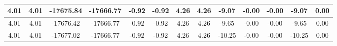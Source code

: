 \begin{table}[htbp]
\begin{adjustbox}{angle=90}
\begin{tabular}{|c|c|c|c|c|c|c|c|c|c|c|c|c|}
 4.01 & 4.01 & -17675.84 & -17666.77 & -0.92 & -0.92 & 4.26 & 4.26 & -9.07 & -0.00 & -0.00 & -9.07 & 0.00\\ \hline
 4.01 & 4.01 & -17676.42 & -17666.77 & -0.92 & -0.92 & 4.26 & 4.26 & -9.65 & -0.00 & -0.00 & -9.65 & 0.00\\ \hline
 4.01 & 4.01 & -17677.02 & -17666.77 & -0.92 & -0.92 & 4.26 & 4.26 & -10.25 & -0.00 & -0.00 & -10.25 & 0.00\\ \hline
            \end{tabular}
        \end{adjustbox}
        \caption{}
        \label{}
    \end{table}
    